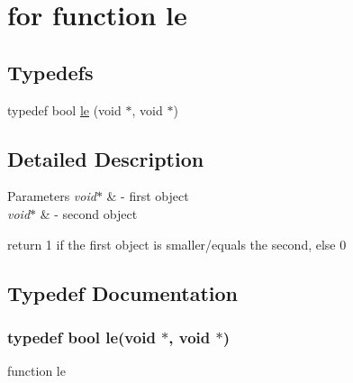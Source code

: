 \hypertarget{group__typedef}{\section{for function le}
\label{group__typedef}
}
\subsection*{Typedefs}
\begin{DoxyCompactItemize}
\item 
typedef bool \hyperlink{group__typedef_gae89f9f095232167d2e3cc1a0a3e8cf1c}{le} (void $\ast$, void $\ast$)
\end{DoxyCompactItemize}


\subsection{Detailed Description}

\begin{DoxyParams}{Parameters}
{\em void$\ast$} & -\/ first object \\
\hline
{\em void$\ast$} & -\/ second object\\
\hline
\end{DoxyParams}
return 1 if the first object is smaller/equals the second, else 0 

\subsection{Typedef Documentation}
\hypertarget{group__typedef_gae89f9f095232167d2e3cc1a0a3e8cf1c}{
\subsubsection[{le}]{\setlength{\rightskip}{0pt plus 5cm}typedef bool le(void $\ast$, void $\ast$)}}\label{group__typedef_gae89f9f095232167d2e3cc1a0a3e8cf1c}
function le 